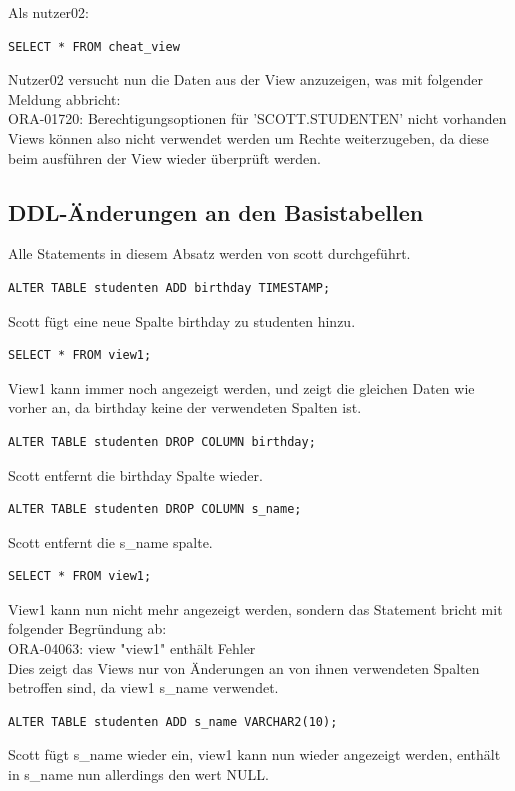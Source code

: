 \documentclass[10pt]{scrreprt}
\begin{document}
Als nutzer02:
\begin{lstlisting}[style=sql]
SELECT * FROM cheat_view
\end{lstlisting}
Nutzer02 versucht nun die Daten aus der View anzuzeigen, was mit folgender Meldung abbricht:\\
ORA-01720: Berechtigungsoptionen für 'SCOTT.STUDENTEN' nicht vorhanden\\
Views können also nicht verwendet werden um Rechte weiterzugeben, da diese beim ausführen der View wieder überprüft werden.

\subsection{DDL-Änderungen an den Basistabellen}
Alle Statements in diesem Absatz werden von scott durchgeführt.
\begin{lstlisting}[style=sql]
ALTER TABLE studenten ADD birthday TIMESTAMP;
\end{lstlisting}
Scott fügt eine neue Spalte birthday zu studenten hinzu.

\begin{lstlisting}[style=sql]
SELECT * FROM view1;
\end{lstlisting}
View1 kann immer noch angezeigt werden, und zeigt die gleichen Daten wie vorher an, da birthday keine der verwendeten Spalten ist.

\begin{lstlisting}[style=sql]
ALTER TABLE studenten DROP COLUMN birthday;
\end{lstlisting}
Scott entfernt die birthday Spalte wieder.

\begin{lstlisting}[style=sql]
ALTER TABLE studenten DROP COLUMN s_name;
\end{lstlisting}
Scott entfernt die s\_name spalte.

\begin{lstlisting}[style=sql]
SELECT * FROM view1;
\end{lstlisting}
View1 kann nun nicht mehr angezeigt werden, sondern das Statement bricht mit folgender Begründung ab:\\
ORA-04063: view "view1" enthält Fehler\\
Dies zeigt das Views nur von Änderungen an von ihnen verwendeten Spalten betroffen sind, da view1 s\_name verwendet. 

\begin{lstlisting}[style=sql]
ALTER TABLE studenten ADD s_name VARCHAR2(10);
\end{lstlisting}
Scott fügt s\_name wieder ein, view1 kann nun wieder angezeigt werden, enthält in s\_name nun allerdings den wert NULL.
\end{document}

